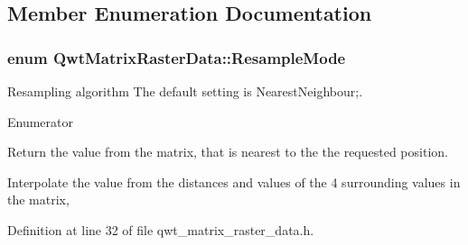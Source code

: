 \subsection{Member Enumeration Documentation}
\hypertarget{class_qwt_matrix_raster_data_a3c8def5d9ae452bd82e6c4b71b480209}{
\subsubsection[{Resample\-Mode}]{\setlength{\rightskip}{0pt plus 5cm}enum {\bf Qwt\-Matrix\-Raster\-Data\-::\-Resample\-Mode}}}\label{class_qwt_matrix_raster_data_a3c8def5d9ae452bd82e6c4b71b480209}


Resampling algorithm The default setting is Nearest\-Neighbour;. 

\begin{Desc}
\item[Enumerator]\par
\begin{description}
\item[{\em 
\hypertarget{class_qwt_matrix_raster_data_a3c8def5d9ae452bd82e6c4b71b480209acaa0a9e3b8afd376472d6a587a3f9873}{Nearest\-Neighbour}\label{class_qwt_matrix_raster_data_a3c8def5d9ae452bd82e6c4b71b480209acaa0a9e3b8afd376472d6a587a3f9873}
}]Return the value from the matrix, that is nearest to the the requested position. \item[{\em 
\hypertarget{class_qwt_matrix_raster_data_a3c8def5d9ae452bd82e6c4b71b480209a6f25a9f1f27cb94525ce39df487af13f}{Bilinear\-Interpolation}\label{class_qwt_matrix_raster_data_a3c8def5d9ae452bd82e6c4b71b480209a6f25a9f1f27cb94525ce39df487af13f}
}]Interpolate the value from the distances and values of the 4 surrounding values in the matrix, \end{description}
\end{Desc}


Definition at line 32 of file qwt\-\_\-matrix\-\_\-raster\-\_\-data.\-h.



